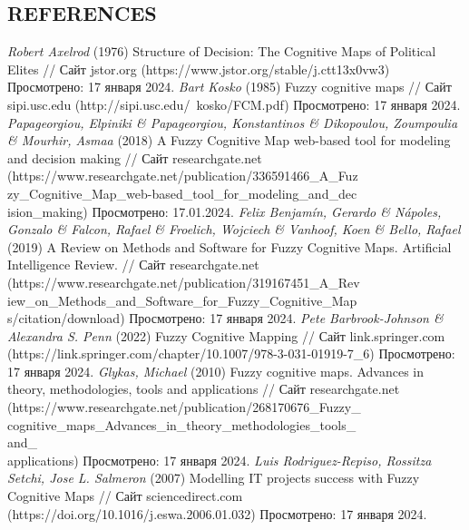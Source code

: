 \documentclass{article}
\begin{document}
    \hfill
    \begin{minipage}{0.49\textwidth}
        \begin{center}
            \chapter{REFERENCES}
        \end{center}
        \begin{thebibliography}{}
             \textit{Robert Axelrod} (1976) Structure of Decision: The Cognitive Maps of Political Elites // Сайт jstor.org (https://www.jstor.org/stable/j.ctt13x0vw3) Просмотрено: 17 января 2024.
             \textit{Bart Kosko} (1985) Fuzzy cognitive maps // Сайт sipi.usc.edu (http://sipi.usc.edu/~kosko/FCM.pdf) Просмотрено: 17 января 2024.
             \textit{Papageorgiou, Elpiniki \& Papageorgiou, Konstantinos \& Dikopoulou, Zoumpoulia \& Mourhir, Asmaa} (2018) A Fuzzy Cognitive Map web-based tool for modeling and decision making // Сайт researchgate.net (https://www.researchgate.net/publication/336591466\_A\_Fuz\\
            zy\_Cognitive\_Map\_web-based\_tool\_for\_modeling\_and\_dec\\ision\_making) Просмотрено: 17.01.2024.
             \textit{Felix Benjamín, Gerardo \& Nápoles, Gonzalo \& Falcon, Rafael \& Froelich, Wojciech \& Vanhoof, Koen \& Bello, Rafael} (2019) A Review on Methods and Software for Fuzzy Cognitive Maps. Artificial Intelligence Review. // Сайт researchgate.net (https://www.researchgate.net/publication/319167451\_A\_Rev\\iew\_on\_Methods\_and\_Software\_for\_Fuzzy\_Cognitive\_Map\\s/citation/download) Просмотрено: 17 января 2024.
             \textit{Pete Barbrook-Johnson \& Alexandra S. Penn} (2022) Fuzzy Cognitive Mapping // Сайт link.springer.com (https://link.springer.com/chapter/10.1007/978-3-031-01919-7\_6) Просмотрено: 17 января 2024.
             \textit{Glykas, Michael} (2010) Fuzzy cognitive maps. Advances in theory, methodologies, tools and applications // Сайт researchgate.net (https://www.researchgate.net/publication/268170676\_Fuzzy\_\\cognitive\_maps\_Advances\_in\_theory\_methodologies\_tools\_\\and\_\\applications) Просмотрено: 17 января 2024.
             \textit{Luis Rodriguez-Repiso, Rossitza Setchi, Jose L. Salmeron} (2007) Modelling IT projects success with Fuzzy Cognitive Maps // Сайт sciencedirect.com (https://doi.org/10.1016/j.eswa.2006.01.032) Просмотрено: 17 января 2024.

\end{thebibliography}
\end{minipage}
\end{document}
